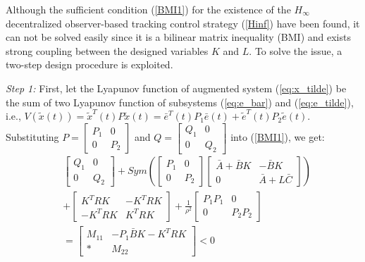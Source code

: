 \documentclass{ieeeaccess}
\begin{document}
Although the sufficient condition (\ref{BMI1}) for the existence of the $H_\infty$ decentralized observer-based tracking control strategy (\ref{Hinf}) have been found, it can not be solved easily since it is a bilinear matrix inequality (BMI) and exists strong coupling between the designed variables $K$ and $L$. To solve the issue, a two-step design procedure is exploited.

\textit{Step 1:} First, let the Lyapunov function of augmented system (\ref{eq:x_tilde}) be the sum of two Lyapunov function of subsystems (\ref{eq:e_bar}) and (\ref{eq:e_tilde}), i.e., $V(\tilde{x}(t))=\tilde{x}^T(t)P\tilde{x}(t)=\bar{e}^T(t)P_1\bar{e}(t)+\tilde{e}^T(t)P_2\tilde{e}(t)$. Substituting $P=\begin{bmatrix}
    P_1 & 0 \\ 0 & P_2
\end{bmatrix}$ and $Q=\begin{bmatrix}
    Q_1 & 0 \\ 0 & Q_2
\end{bmatrix}$ into (\ref{BMI1}), we get:
\begin{equation} \label{eq:M}
    \begin{split}
        & \begin{bmatrix}
            Q_1 & 0 \\ 0 & Q_2
        \end{bmatrix} + Sym(\begin{bmatrix}
            P_1 & 0 \\ 0 & P_2
        \end{bmatrix}\begin{bmatrix}
            \bar{A}+\bar{B}K & -\bar{B}K \\ 0 & \bar{A}+L\bar{C}
        \end{bmatrix})  \\
        & + \begin{bmatrix}
            K^TRK & -K^TRK \\ -K^TRK & K^TRK
        \end{bmatrix} + \frac{1}{\rho^2}\begin{bmatrix}
            P_1P_1 & 0 \\ 0 & P_2P_2
        \end{bmatrix} \\
        & = \begin{bmatrix}
            M_{11} & -P_1\bar{B}K - K^TRK \\ * & M_{22}
        \end{bmatrix} < 0
    \end{split}
\end{equation}
\end{document}
